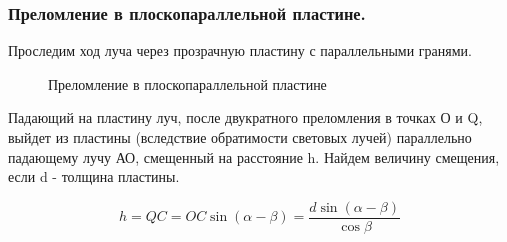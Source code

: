 \documentclass[12pt,a4paper,draft]{article}
\begin{document}
    \subsubsection{Преломление в плоскопараллельной пластине.}
        Проследим ход луча через прозрачную пластину с параллельными гранями.

        \begin{figure}[H]%
            \noindent{}
            \caption{Преломление в плоскопараллельной пластине}
        \end{figure}

        Падающий на пластину луч, после двукратного преломления в точках О и Q, выйдет из пластины (вследствие обратимости световых лучей) параллельно падающему лучу АО, смещенный на расстояние h. Найдем величину смещения, если d - толщина пластины.

        \begin{equation}
            \label{rasst}
            h = QC = OC\sin(\alpha-\beta) = \frac{d\sin(\alpha-\beta)}{\cos\beta}
        \end{equation}
\end{document}
